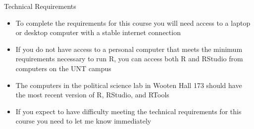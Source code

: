 \documentclass[12pt,ignorenonframetext,aspectratio=169]{beamer}
\begin{document}
\begin{frame}{Technical Requirements}
\protect\hypertarget{technical-requirements}{}
\begin{itemize}[<+->]
\item
  To complete the requirements for this course you will need access to a
  laptop or desktop computer with a stable internet connection
\item
  If you do not have access to a personal computer that meets the
  minimum requirements necessary to run R, you can access both R and
  RStudio from computers on the UNT campus
\item
  The computers in the political science lab in Wooten Hall 173 should
  have the most recent version of R, RStudio, and RTools
\item
  If you expect to have difficulty meeting the technical requirements
  for this course you need to let me know immediately
\end{itemize}
\end{frame}
\end{document}
